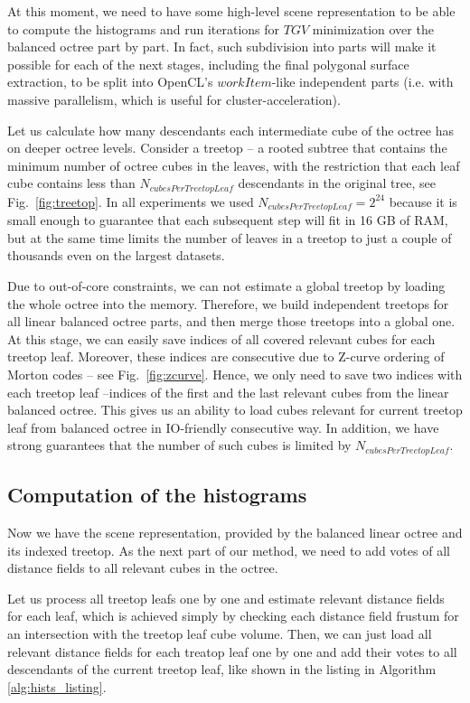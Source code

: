 \documentclass[10pt,twocolumn,letterpaper]{article}
\begin{document}
At this moment, we need to have some high-level scene representation to be able to compute the histograms and
run iterations for $TGV$ minimization over the balanced octree part by part. In fact, such
subdivision into parts will make it possible for each of the next stages, including the final polygonal surface extraction,
to be split into OpenCL's $workItem$-like independent parts (i.e. with massive parallelism, which is useful for cluster-acceleration).

Let us calculate how many descendants each intermediate cube of the octree has on deeper octree levels.
Consider a treetop -- a rooted subtree that contains the minimum number of octree cubes in the leaves, with the restriction that each
leaf cube contains less than $N_{cubesPerTreetopLeaf}$ descendants in the original tree, see Fig.~\ref{fig:treetop}.
In all experiments we used $N_{cubesPerTreetopLeaf} = 2^{24}$
because it is small enough to guarantee that each subsequent step will fit in 16 GB of RAM, but at the same time limits
the number of leaves in a treetop to just a couple of thousands even on the largest datasets.

Due to out-of-core constraints, we can not estimate a global treetop by loading the whole octree into the memory.
Therefore, we build independent treetops for all linear balanced octree parts, and then merge those treetops
into a global one. At this stage, we can easily save indices of all covered relevant cubes for each treetop leaf.
Moreover, these indices are consecutive due to Z-curve ordering of Morton codes -- see Fig.~\ref{fig:zcurve}.
Hence, we only need to save two indices with each treetop leaf --indices of the first and the last relevant cubes from the linear balanced octree.
This gives us an ability to load cubes relevant for current treetop leaf from balanced octree in IO-friendly consecutive way.
In addition, we have strong guarantees that the number of such cubes is limited by $N_{cubesPerTreetopLeaf}$.

\subsection{Computation of the histograms}
\label{sec:hists-init}

Now we have the scene representation, provided by the balanced linear octree and its indexed treetop. As the next part of our method,
we need to add votes of all distance fields to all relevant cubes in the octree.

Let us process all treetop leafs one by one and estimate relevant distance fields for each leaf, which is achieved simply by
checking each distance field frustum for an intersection with the treetop leaf cube volume. Then, we can just load all relevant distance fields
for each treatop leaf one by one and add their votes to all descendants
of the current treetop leaf, like shown in the listing in Algorithm \ref{alg:hists_listing}.
\end{document}
